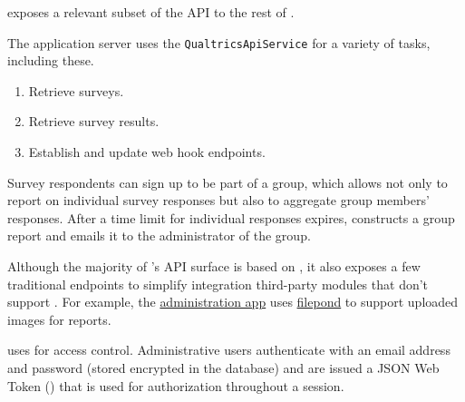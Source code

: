 \documentclass{article}
\begin{document}
\caper{} exposes
a relevant subset of the \qual{} \rest{} API
to the rest of \caper.

The application server
uses the \texttt{QualtricsApiService}
for a variety of tasks, including these.
\begin{enumerate}
\item Retrieve surveys.
\item Retrieve survey results.
\item Establish and update \qual{} web hook endpoints.
\end{enumerate}

Survey respondents can sign up to be part of a group,
which allows \caper{}
not only to report on individual survey responses
but also to aggregate group members' responses.
After a time limit for individual responses expires,
\caper{}
constructs a group report
and emails it to the administrator of the group.


Although the majority of \caper{}'s API surface
is based on \gql{},
it also exposes a few traditional \rest{} endpoints
to simplify integration third-party modules
that don't support \gql.
For example, the \caper{}
\hyperref[sec:admin-app]{administration app}
uses
\href{https://www.npmjs.com/package/filepond}{filepond}
to support uploaded images for reports.

\caper{} uses \jwt{} for access control.
Administrative users authenticate
with an email address and password (stored encrypted in the \caper{} database)
and are issued a JSON Web Token (\jwt)
that is used for authorization throughout a session.
\end{document}

